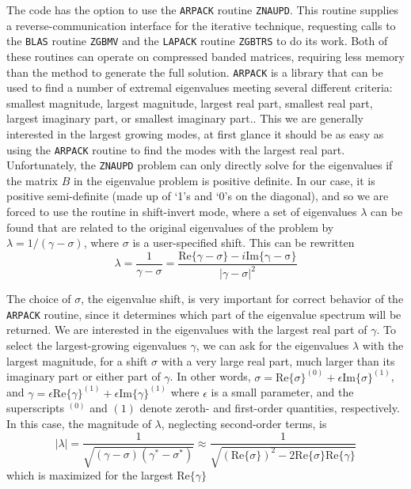 \documentclass[letterpaper]{article}
\begin{document}
The code has the option to use the \texttt{ARPACK} routine
\texttt{ZNAUPD}. This routine supplies a reverse-communication
interface for the iterative technique, requesting calls to the
\texttt{BLAS} routine \texttt{ZGBMV} and the \texttt{LAPACK} routine
\texttt{ZGBTRS} to do its work. Both of these routines can operate on
compressed banded matrices, requiring less memory than the method to
generate the full solution. \texttt{ARPACK} is a library that can be
used to find a number of extremal eigenvalues meeting several
different criteria: smallest magnitude, largest magnitude, largest
real part, smallest real part, largest imaginary part, or smallest
imaginary part.. This we are generally interested in the largest
growing modes, at first glance it should be as easy as using the
\texttt{ARPACK} routine to find the modes with the largest real
part. Unfortunately, the \texttt{ZNAUPD} problem can only directly
solve for the eigenvalues if the matrix $B$ in the eigenvalue problem
is positive definite. In our case, it is positive semi-definite (made
up of `1's and `0's on the diagonal), and so we are forced to use the
routine in shift-invert mode, where a set of eigenvalues $\lambda$ can
be found that are related to the original eigenvalues of the problem
by $\lambda = 1/(\gamma-\sigma)$, where $\sigma$ is a user-specified
shift. This can be rewritten
\begin{equation}
\lambda = \frac{1}{\gamma-\sigma} = \frac{\mathrm{Re}\{\gamma-\sigma\} 
                                          - i\mathrm{Im\{\gamma-\sigma\}}}
                                         {|\gamma-\sigma|^2}
\end{equation}

The choice of $\sigma$, the eigenvalue shift, is very important for
correct behavior of the \texttt{ARPACK} routine, since it determines
which part of the eigenvalue spectrum will be returned. We are
interested in the eigenvalues with the largest real part of $\gamma$.
To select the largest-growing eigenvalues $\gamma$, we can ask for the
eigenvalues $\lambda$ with the largest magnitude, for a shift $\sigma$
with a very large real part, much larger than its imaginary part or
either part of $\gamma$. In other words, $\sigma =
\mathrm{Re}\{\sigma\}^{(0)} + \epsilon\mathrm{Im}\{\sigma\}^{(1)}$,
and $\gamma = \epsilon\mathrm{Re}\{\gamma\}^{(1)} +
\epsilon\mathrm{Im}\{\gamma\}^{(1)}$ where $\epsilon$ is a small
parameter, and the superscripts $^{(0)}$ and ${(1)}$ denote zeroth-
and first-order quantities, respectively. In this case, the magnitude
of $\lambda$, neglecting second-order terms, is
\begin{equation}
|\lambda| = \frac{1}{\sqrt{\left(\gamma-\sigma\right)
                           \left(\gamma^*-\sigma^*\right)}}
\approx \frac{1}{\sqrt{\left(\mathrm{Re}\{\sigma\}\right)^2 
                       - 2\mathrm{Re}\{\sigma\}\mathrm{Re}\{\gamma\}}}
\end{equation}
which is maximized for the largest $\mathrm{Re}\{\gamma\}$
\end{document}
